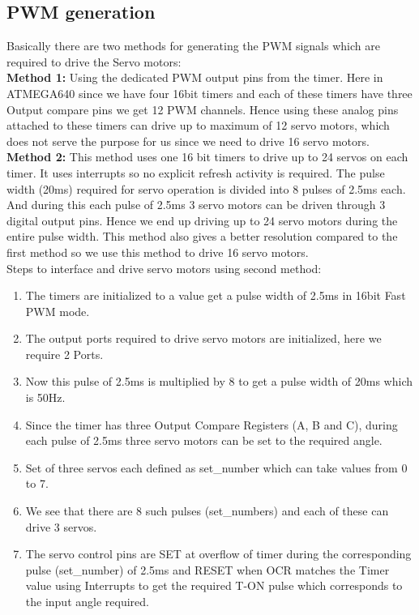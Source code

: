 \documentclass[12pt]{article}
\begin{document}
\subsection{PWM generation}
Basically there are two methods for generating the PWM signals which are required to
drive the Servo motors:\\
\textbf{Method 1:} Using the dedicated PWM output pins from the timer. Here in ATMEGA640
since we have four 16bit timers and each of these timers have three Output compare pins
we get 12 PWM channels. Hence using these analog pins attached to these timers can drive
up to maximum of 12 servo motors, which does not serve the purpose for us since we need
to drive 16 servo motors.\\
\textbf{Method 2:} This method uses one 16 bit timers to drive up to 24 servos on each timer. It
uses interrupts so no explicit refresh activity is required. The pulse width (20ms) required
for servo operation is divided into 8 pulses of 2.5ms each. And during this each pulse of
2.5ms 3 servo motors can be driven through 3 digital output pins. Hence we end up driving
up to 24 servo motors during the entire pulse width. This method also gives a better
resolution compared to the first method so we use this method to drive 16 servo motors.\\
Steps to interface and drive servo motors using second method:\\
\begin{enumerate}
\item The timers are initialized to a value get a pulse width of 2.5ms in 16bit Fast PWM
mode.
\item The output ports required to drive servo motors are initialized, here we require 2
Ports.
\item Now this pulse of 2.5ms is multiplied by 8 to get a pulse width of 20ms which is
50Hz.
\item Since the timer has three Output Compare Registers (A, B and C), during each pulse
of 2.5ms three servo motors can be set to the required angle.
\item Set of three servos each defined as set\_number which can take values from 0 to 7.
\item We see that there are 8 such pulses (set\_numbers) and each of these can drive 3
servos.
\item The servo control pins are SET at overflow of timer during the corresponding pulse
(set\_number) of 2.5ms and RESET when OCR matches the Timer value using
Interrupts to get the required T-ON pulse which corresponds to the input angle
required.
\end{enumerate}
\end{document}

